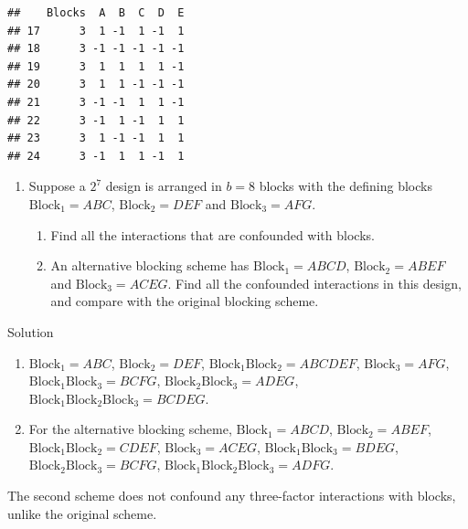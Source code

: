 \documentclass[
]{book}
\theoremstyle{definition}
\theoremstyle{definition}
\theoremstyle{definition}
\theoremstyle{definition}
\theoremstyle{remark}
\begin{document}
\begin{verbatim}
##    Blocks  A  B  C  D  E
## 17      3  1 -1  1 -1  1
## 18      3 -1 -1 -1 -1 -1
## 19      3  1  1  1  1 -1
## 20      3  1  1 -1 -1 -1
## 21      3 -1 -1  1  1 -1
## 22      3 -1  1 -1  1  1
## 23      3  1 -1 -1  1  1
## 24      3 -1  1  1 -1  1
\end{verbatim}

\begin{enumerate}
\def\labelenumi{\arabic{enumi}.}
\setcounter{enumi}{1}
\item
  Suppose a \(2^7\) design is arranged in \(b=8\) blocks with the defining blocks \(\mathrm{Block}_1 = ABC\), \(\mathrm{Block}_2 = DEF\) and \(\mathrm{Block}_3 = AFG\).

  \begin{enumerate}
  \def\labelenumii{\alph{enumii}.}
  \item
    Find all the interactions that are confounded with blocks.
  \item
    An alternative blocking scheme has \(\mathrm{Block}_1 = ABCD\), \(\mathrm{Block}_2 = ABEF\) and \(\mathrm{Block}_3 = ACEG\). Find all the confounded interactions in this design, and compare with the original blocking scheme.
  \end{enumerate}
\end{enumerate}

Solution

\begin{enumerate}
\def\labelenumi{\alph{enumi}.}
\item
  \(\mathrm{Block}_1 = ABC\), \(\mathrm{Block}_2 = DEF\), \(\mathrm{Block}_1\mathrm{Block}_2 = ABCDEF\), \(\mathrm{Block}_3 = AFG\), \(\mathrm{Block}_1\mathrm{Block}_3 = BCFG\), \(\mathrm{Block}_2\mathrm{Block}_3 = ADEG\), \(\mathrm{Block}_1\mathrm{Block}_2\mathrm{Block}_3 = BCDEG\).
\item
  For the alternative blocking scheme, \(\mathrm{Block}_1 = ABCD\), \(\mathrm{Block}_2 = ABEF\), \(\mathrm{Block}_1\mathrm{Block}_2 = CDEF\), \(\mathrm{Block}_3 = ACEG\), \(\mathrm{Block}_1\mathrm{Block}_3 = BDEG\), \(\mathrm{Block}_2\mathrm{Block}_3 = BCFG\), \(\mathrm{Block}_1\mathrm{Block}_2\mathrm{Block}_3 = ADFG\).
\end{enumerate}

The second scheme does not confound any three-factor interactions with blocks, unlike the original scheme.
\end{document}
